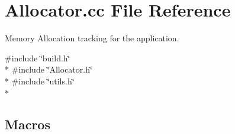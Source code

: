\section{Allocator.\-cc File Reference}
\label{_allocator_8cc}


Memory Allocation tracking for the application.  


{\ttfamily \#include \char`\"{}build.\-h\char`\"{}}\\*
{\ttfamily \#include \char`\"{}Allocator.\-h\char`\"{}}\\*
{\ttfamily \#include \char`\"{}utils.\-h\char`\"{}}\\*
\subsection*{Macros}
